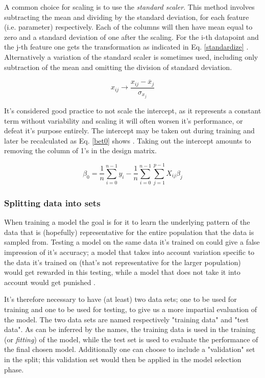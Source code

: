 A common choice for scaling is to use the \textit{standard scaler}. This method involves subtracting the mean and dividing by the standard deviation, for each feature (i.e. parameter) respectively. Each of the columns will then have mean equal to zero and a standard deviation of one after the scaling. For the i-th datapoint and the j-th feature one gets the transformation as indicated in Eq. \ref{standardize} \citep[Linear Regression]{morten}. Alternatively a variation of the standard scaler is sometimes used, including only subtraction of the mean and omitting the division of standard deviation.

\begin{equation}\label{standardize}
    x_{ij} \rightarrow \frac{x_{ij}-\overline{x}_j}{\sigma_{x_j}}
\end{equation}

It's considered good practice to not scale the intercept, as it represents a constant term without variability and scaling it will often worsen it's performance, or defeat it's purpose entirely. 
The intercept may be taken out during training and later be recalculated as Eq. \ref{bet0} shows \citep[Resampling methods]{morten}. 
Taking out the intercept amounts to removing the column of 1's in the design matrix. 

\begin{equation}\label{bet0}
    \beta_0 = \frac{1}{n}\sum_{i=0}^{n-1}y_i - \frac{1}{n}\sum_{i=0}^{n-1}\sum_{j=1}^{p-1}X_{ij}\beta_j
\end{equation}

\subsubsection{Splitting data into sets}\label{overfitting}

When training a model the goal is for it to learn the underlying pattern of the data that is (hopefully) representative for the entire population that the data is sampled from. 
Testing a model on the same data it's trained on could give a false impression of it's accuracy; a model that takes into account variation specific to the data it's trained on (that's not representative for the larger population) would get rewarded in this testing, while a model that does not take it into account would get punished \cite[p. 228]{hastie}. 

It's therefore necessary to have (at least) two data sets; one to be used for training and one to be used for testing, to give us a more impartial evaluation of the model. The two data sets are named respectively "training data" and "test data". As can be inferred by the names, the training data is used in the training (or \textit{fitting}) of the model, while the test set is used to evaluate the performance of the final chosen model. 
Additionally one can choose to include a "validation" set in the split; this validation set would then be applied in the model selection phase.

